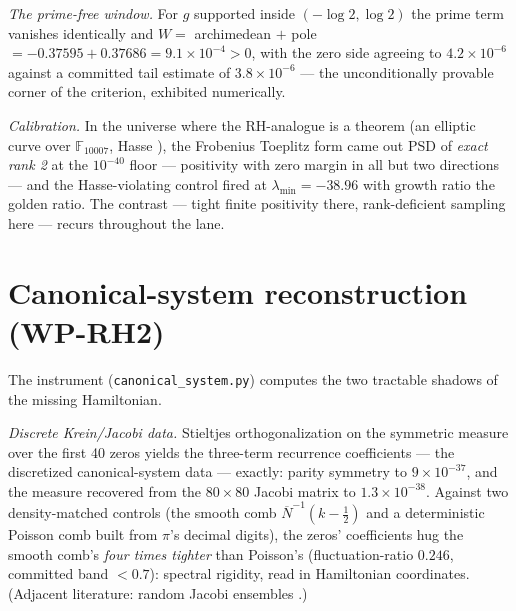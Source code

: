 \documentclass[11pt]{article}
\theoremstyle{remark}
\newcommand{\Nbar}{\overline{N}}
\begin{document}
\emph{The prime-free window.} For $g$ supported inside $(-\log 2, \log 2)$ the prime term vanishes
identically and $W = $ archimedean $+$ pole $= -0.37595 + 0.37686 = 9.1\times10^{-4} > 0$, with the
zero side agreeing to $4.2\times10^{-6}$ against a committed tail estimate of $3.8\times10^{-6}$ ---
the unconditionally provable corner of the criterion, exhibited numerically.

\emph{Calibration.} In the universe where the RH-analogue is a theorem (an elliptic curve over
$\mathbb F_{10007}$, Hasse \cite{Hasse}), the Frobenius Toeplitz form came out PSD of \emph{exact
rank 2} at the $10^{-40}$ floor --- positivity with zero margin in all but two directions --- and the
Hasse-violating control fired at $\lambda_{\min} = -38.96$ with growth ratio the golden ratio. The
contrast --- tight finite positivity there, rank-deficient sampling here --- recurs throughout the
lane.

\section{Canonical-system reconstruction (WP-RH2)}

The instrument (\texttt{canonical\_system.py}) computes the two tractable shadows of the missing
Hamiltonian.

\emph{Discrete Krein/Jacobi data.} Stieltjes orthogonalization on the symmetric measure over the
first 40 zeros yields the three-term recurrence coefficients --- the discretized canonical-system
data --- exactly: parity symmetry to $9\times10^{-37}$, and the measure recovered from the
$80\times80$ Jacobi matrix to $1.3\times10^{-38}$. Against two density-matched controls (the smooth
comb $\Nbar^{-1}(k - \tfrac12)$ and a deterministic Poisson comb built from $\pi$'s decimal digits),
the zeros' coefficients hug the smooth comb's \emph{four times tighter} than Poisson's
(fluctuation-ratio $0.246$, committed band $< 0.7$): spectral rigidity, read in Hamiltonian
coordinates. (Adjacent literature: random Jacobi ensembles \cite{KillipNenciu}.)
\end{document}
